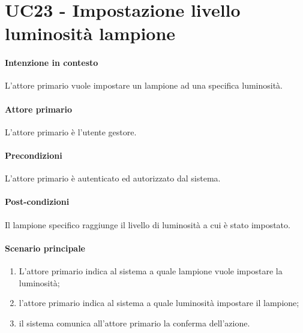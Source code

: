 \section{UC23 - Impostazione livello luminosità lampione}\label{uc:23}
\paragraph{Intenzione in contesto} L'attore primario vuole impostare un lampione ad una specifica luminosità.

\paragraph{Attore primario} L'attore primario è l'utente gestore.

\paragraph{Precondizioni} L'attore primario è autenticato ed autorizzato dal sistema.

\paragraph{Post-condizioni} Il lampione specifico raggiunge il livello di luminosità a cui è stato impostato.
\paragraph{Scenario principale}
\begin{enumerate}
    \item L'attore primario indica al sistema a quale lampione vuole impostare la luminosità;
    \item l'attore primario indica al sistema a quale luminosità impostare il lampione;
    \item il sistema comunica all'attore primario la conferma dell'azione.
\end{enumerate}
